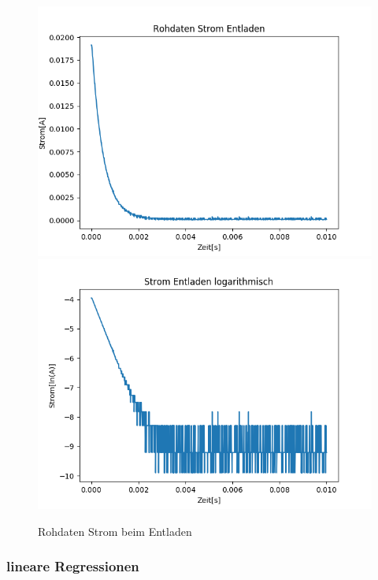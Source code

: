 \documentclass[12pt,a4paper]{article}
\begin{document}
\begin{figure}[H]
\begin{center}
\includegraphics[width=0.49\linewidth]{Bilder/Kondensator_ent_I}
\includegraphics[width=0.49\linewidth]{Bilder/Kondensator_ent_logI}
\caption[Rohdaten logarith. A]{Rohdaten Strom beim Entladen}
\label{fig:RohU}
\end{center}
\end{figure}
\subsubsection{lineare Regressionen}
\end{document}
